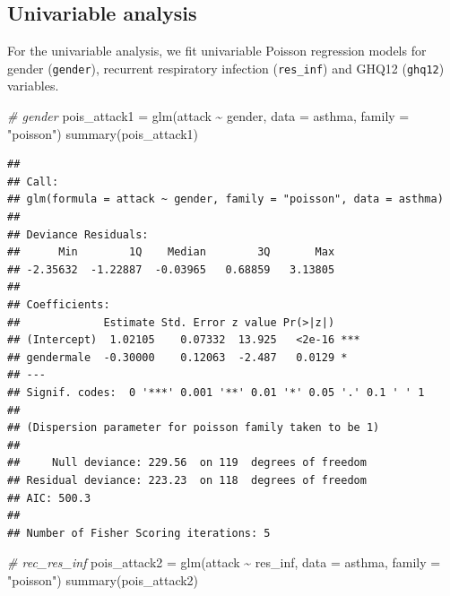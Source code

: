 \documentclass[
  10pt,
]{krantz}
\newenvironment{Shaded}{\begin{snugshade}}{\end{snugshade}}
\newcommand{\AttributeTok}[1]{\textcolor[rgb]{0.77,0.63,0.00}{#1}}
\newcommand{\CommentTok}[1]{\textcolor[rgb]{0.56,0.35,0.01}{\textit{#1}}}
\newcommand{\FunctionTok}[1]{\textcolor[rgb]{0.00,0.00,0.00}{#1}}
\newcommand{\NormalTok}[1]{#1}
\newcommand{\OtherTok}[1]{\textcolor[rgb]{0.56,0.35,0.01}{#1}}
\newcommand{\SpecialCharTok}[1]{\textcolor[rgb]{0.00,0.00,0.00}{#1}}
\newcommand{\StringTok}[1]{\textcolor[rgb]{0.31,0.60,0.02}{#1}}
\begin{document}
\hypertarget{univariable-analysis-2}{%
\subsection{Univariable analysis}\label{univariable-analysis-2}}

For the univariable analysis, we fit univariable Poisson regression models for gender (\texttt{gender}), recurrent respiratory infection (\texttt{res\_inf}) and GHQ12 (\texttt{ghq12}) variables.

\begin{Shaded}
\begin{Highlighting}[]
\CommentTok{\# gender}
\NormalTok{pois\_attack1 }\OtherTok{=} \FunctionTok{glm}\NormalTok{(attack }\SpecialCharTok{\textasciitilde{}}\NormalTok{ gender, }\AttributeTok{data =}\NormalTok{ asthma, }\AttributeTok{family =} \StringTok{"poisson"}\NormalTok{)}
\FunctionTok{summary}\NormalTok{(pois\_attack1)}
\end{Highlighting}
\end{Shaded}

\begin{verbatim}
## 
## Call:
## glm(formula = attack ~ gender, family = "poisson", data = asthma)
## 
## Deviance Residuals: 
##      Min        1Q    Median        3Q       Max  
## -2.35632  -1.22887  -0.03965   0.68859   3.13805  
## 
## Coefficients:
##             Estimate Std. Error z value Pr(>|z|)    
## (Intercept)  1.02105    0.07332  13.925   <2e-16 ***
## gendermale  -0.30000    0.12063  -2.487   0.0129 *  
## ---
## Signif. codes:  0 '***' 0.001 '**' 0.01 '*' 0.05 '.' 0.1 ' ' 1
## 
## (Dispersion parameter for poisson family taken to be 1)
## 
##     Null deviance: 229.56  on 119  degrees of freedom
## Residual deviance: 223.23  on 118  degrees of freedom
## AIC: 500.3
## 
## Number of Fisher Scoring iterations: 5
\end{verbatim}

\begin{Shaded}
\begin{Highlighting}[]
\CommentTok{\# rec\_res\_inf}
\NormalTok{pois\_attack2 }\OtherTok{=} \FunctionTok{glm}\NormalTok{(attack }\SpecialCharTok{\textasciitilde{}}\NormalTok{ res\_inf, }\AttributeTok{data =}\NormalTok{ asthma, }\AttributeTok{family =} \StringTok{"poisson"}\NormalTok{)}
\FunctionTok{summary}\NormalTok{(pois\_attack2)}
\end{Highlighting}
\end{Shaded}
\end{document}
